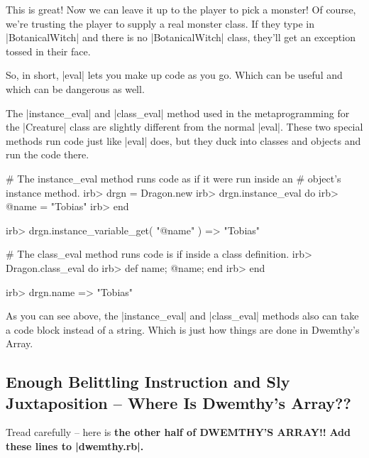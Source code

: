 \documentclass[12pt,twoside]{report}
\begin{document}
This is great!  Now we can leave it up to the player to pick a
monster!  Of course, we're trusting the player to supply a real
monster class.  If they type in
\rubyinline|BotanicalWitch| and there is no
\rubyinline|BotanicalWitch| class, they'll get an
exception tossed in their face.

So, in short, \rubyinline|eval| lets you make up code
as you go.  Which can be useful and which can be dangerous as well.

The \rubyinline|instance_eval| and
\rubyinline|class_eval| method used in the
metaprogramming for the \rubyinline|Creature| class
are slightly different from the normal
\rubyinline|eval|.  These two special methods run code
just like \rubyinline|eval| does, but they duck into
classes and objects and run the code there.


\begin{consolecode}

 # The instance_eval method runs code as if it were run inside an
 # object's instance method.
 irb> drgn = Dragon.new
 irb> drgn.instance_eval do
 irb>   @name = "Tobias"
 irb> end

 irb> drgn.instance_variable_get( "@name" )
   => "Tobias"

 # The class_eval method runs code is if inside a class definition.
 irb> Dragon.class_eval do
 irb>   def name; @name; end
 irb> end

 irb> drgn.name
   => "Tobias"

\end{consolecode}


As you can see above, the \rubyinline|instance_eval|
and \rubyinline|class_eval| methods also can take a
code block instead of a string.  Which is just how things are done in
Dwemthy's Array.



\subsection{Enough Belittling Instruction and Sly Juxtaposition -- Where Is Dwemthy's Array??}



Tread carefully -- here is {\bf the other half of DWEMTHY'S ARRAY!!}
{\bf Add these lines to \rubyinline|dwemthy.rb|.}
\end{document}
